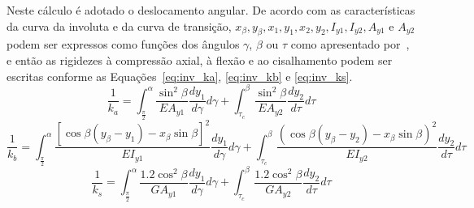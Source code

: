 Neste cálculo é adotado o deslocamento angular. De acordo com as características da curva da involuta e da curva de transição, $x_\beta, y_\beta, x_1, y_1, x_2, y_2, I_{y1}, I_{y2}, A_{y1}$ e $A_{y2}$ podem ser expressos como funções dos ângulos $\gamma$, $\beta$ ou $\tau$ como apresentado por~, e então as rigidezes à compressão axial, à flexão e ao cisalhamento podem ser escritas conforme as Equações~\ref{eq:inv_ka}, \ref{eq:inv_kb} e \ref{eq:inv_ks}.
\newpage
\begin{equation} \label{eq:inv_ka}
	\frac{1}{k_a} = \int_{\frac{\pi}{2}}^{\alpha} \frac{\sin^2 \beta}{EA_{y1}} \frac{dy_1}{d\gamma} d\gamma + \int_{\tau_c}^{\beta} \frac{\sin^2 \beta}{EA_{y2}} \frac{dy_2}{d\tau} d\tau
\end{equation}
\begin{equation} \label{eq:inv_kb}
	\frac{1}{k_b} = \int_{\frac{\pi}{2}}^{\alpha} \frac{[\cos \beta(y_\beta - y_1) - x_\beta \sin \beta]^2}{EI_{y1}} \frac{dy_1}{d\gamma} d\gamma + \int_{\tau_c}^{\beta} \frac{(\cos \beta(y_\beta - y_2) - x_\beta \sin \beta)^2}{EI_{y2}} \frac{dy_2}{d\tau} d\tau
\end{equation}
\begin{equation} \label{eq:inv_ks}
	\frac{1}{k_s} = \int_{\frac{\pi}{2}}^{\alpha} \frac{1.2 \cos^2 \beta}{GA_{y1}} \frac{dy_1}{d\gamma} d\gamma + \int_{\tau_c}^{\beta} \frac{1.2 \cos^2 \beta}{GA_{y2}} \frac{dy_2}{d\tau} d\tau
\end{equation}



